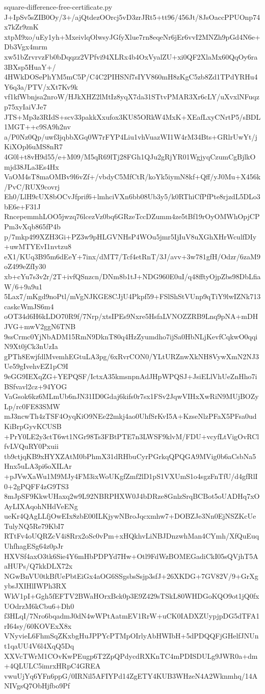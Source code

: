 \documentclass[11pt]{article}
\theoremstyle{definition}
\theoremstyle{remark}
\begin{document}
\begin{filecontents*}[overwrite]{square-difference-free-certificate.py}
J+IpSv5sZIB0Oy/3+/ajQtdezOOrcj5vD3zrJRt5+tt96/456Jt/8JsOaccPPUOnp74x7kZr9znK
xtpM9xo/uEy1yh+MxeivlqOlwsyJGfyXlue7rn8eqeNr6jEr6vvI2MNZh9pGd4N6e+Db3Vgx4mrm
xw51bZrvrvzFb0bDqqzz2VPfvi94XLRx4b4OxVyalZU+xi0QF2XlaMx60QqOy6ra3BXsp5HuaY+/
4HWkDOSePhYM5mC5P/C4C2PIHSNf7sIYV860mH8zKgC5zb8Zd1TPdYRHu4Y6q3a/PTV/xXt7Kv9k
vf1kfWbnjsa2nroW/HJkXHZ2lMtIz8yqX7da31STtvPMAR3Xr6cLY/uXvxlNFuqzp75xyIaiVJe7
JTS+Mp3z3RIdS+scv33pakkXxufox3KU85ORkW4MxK+XEafLxyCNrtP5/sBDL1MGT++c9SA9h2nv
a/P0Nz0Qp/uwf3jqbbXGq0W7rFYP4Liu1vhVuazWI1W4rM34Bts+GRlrUwYt/jKiXOpl6uMS8nR7
4G0l+t8vH9d55/e+M09/M5qR69lTj28FGh1QJu2gRjYR01WgjyqCzumCgBjlkOmjd38JLa3Es4Hx
VaOM4sT8maOMBv9l6vZf+/vbdyC5MfCtR/koYk5iymN8kf+Qff/yJ0Mu+X456k/PvC/RUX9covrj
Eh0/LlH9cUX8bOCvJfprif6+lmhciVXn6bb08Ub3y5/k0RThiCfPfPte8rjzdL5DLo3bE6e+F31J
RncepemmhLOO5jwzq76lcezVz0bq6GRzeTccDZumm4ze5tBf19rOyOMWhOpjCPPm3vXqb865fP4b
p/7mkp499XZH3Gi+PZ3w9pHLGVNHsP4WOu5jmr5IjIuV8uXGhXHrWculfDIy+uwMTYEvI1nvtzu8
eX1/KUq3B95m6dEeY+7inx/dMT7/Tcf4etRnT/3J/avv+3w781gfH/Odzr/6zaM9oZ499eZfIy30
xb+cYu7s3v2r/2T+ivfQSnzcn/DNm8b1tJ+NDG960E0uI/q48fftyOjpZbs98DbLfiaW/6+9a9u1
5Lax7/mKgd9noPtl/mVgNJKGE8CJjU4Pkpf59+FSlShStVUnp9qTiY9lwIZNk713caskcWmJS6m4
oOT34d6H6kLDO70R9f/7Nrp/xtsIPEs9Nxre5HsfaLVNOZZRB9Lnq9pNA+mDHJVG+mwV2ggN6TNB
9ssCrmc0YjNbADM15RmN9DknT80q4HzZyumdho7ijSa0HbNLjKevfCqkwO0qqiN9Xt0jCk3nUzIa
gPTh8EwjfdlMvemhEGtuLA3pg/6xRvrCON0/YLtURZnwXkNH8VywXmN2NJ3Ue59gIvehvEZ1pC9I
9eGG9IEXqZG+YEPQSF/IctxA35kmsnpnAdJHpWPQSJ+JsiELlVhUeZnHho7iBSfvavl2cz+94YOG
VaGsok6kz6MLmUb6nJN31ID0Gdaj6kifs0r7sx1FSv2JqwVIHxXwRiN9MUjBOZyLp/rc0FE83SMW
mJ3ncwTh4zTSF4OyqKiO9NEe22mkj4ao0UhfSrKvI5A+KzseNlzPFaX5PFsa0udKiBrpGyvKCUSB
+PrY0LE2y3ctT6wt1NGr98Ts3FBtPTE7n3LWSF9klvM/FDU+vcyfLtVigOvRClfvLVQuRY0Pxuii
tb9ctjqKB9xHYXZAtM0bPhmX31dRHbuCyrPGrkqQPQGA9MVig0b6aCsbNa5Hnx5uLA3pi6oXILAr
+pJVwXaWu1M9MJy4FM3ixWoUKgfZmf2lD1pS1VXUmS1o4sgzFnTfU/d4gfRlI0+2gPQFF4zG9TS3
8mJpSF9KkwUHaxq2w9L92NBRPHXW0J4bDRze8GnlzSrqBCBot5oUADHq7xOAyLIXAqohNHdVeENg
ueKr4QAgLLfjOwEIx8zbE00ILKjywNBroJqcxmhw7+DOBZJe3Nn0EjNSZKcUeTulyNQ5Re79KbI7
RTtFv4oUQRZcV4i8Rrx2oSc0vPm+xHQkhvLiNBJDnzwhMan4CYmh/XfQuEuqUhfhagESg64z0pJr
HXVSf4axO3tk6Sie4Y6mHbPDPYd7Hw+Otl9FdWzBOMEGadiCkI05sQVjhT5AaHUPs/Q7kkDLX72x
NGwBnVU0tkBfUePbtEiGx4aOG6SSgsbsSsjp3sfJ+26XKDG+7GV82V/9+GrXgybsJXIHlIWPh3RX
WkV1pI+Ggh5fEFTV2BWaHOrxBck0p3E9Z429sTSkL80WHDGoKQO9ot1jQ0fxUOdrzM6kCbu6+Dh0
f3HLqI/7Nro6bqadmJ0dN4wWPtAatmEV1RrW+uCK0IADXZUypjpDG5dTFA1rI64sy/60KOVExX8x
VNyvieL6FhmSqZKxbgHuJPPYcPTMpOIrlyAbHWIbH+5dPDQQFjGHelfJNUnt1qaUU4V6l4XqQ5Dq
XXVcTWrM1COvKwPEugp6T2ZpQPdycdRXKnTC4mPDISDULg9JWR0a+dm+4QLULC5imrxHRpC4GREA
vwuUjYq6YFn6ppG/0IRNil5AFIYPd14ZgETY4KUB3WHzeN4A2Wknmhq/14ANIVgsQ7ObHjfbo9Pf

\end{filecontents*}
\end{document}
